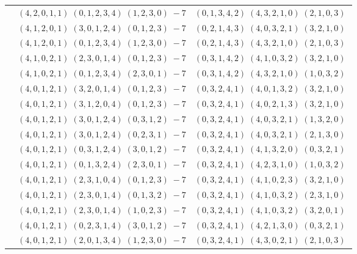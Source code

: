 \documentclass[11pt]{article}
\begin{document}
\begin{longtable}[l]{|c|c|c|}
 \cline{2-3} 
 & $(4 ,2 ,0 ,1 ,1) \;(0 ,1 ,2 ,3 ,4) \;(1 ,2 ,3 ,0) \;-7$ & $(0 ,1 ,3 ,4 ,2) \;(4 ,3 ,2 ,1 ,0) \;(2 ,1 ,0 ,3) \;$\\ 
 \cline{2-3} 
 & $(4 ,1 ,2 ,0 ,1) \;(3 ,0 ,1 ,2 ,4) \;(0 ,1 ,2 ,3) \;-7$ & $(0 ,2 ,1 ,4 ,3) \;(4 ,0 ,3 ,2 ,1) \;(3 ,2 ,1 ,0) \;$\\ 
 \cline{2-3} 
 & $(4 ,1 ,2 ,0 ,1) \;(0 ,1 ,2 ,3 ,4) \;(1 ,2 ,3 ,0) \;-7$ & $(0 ,2 ,1 ,4 ,3) \;(4 ,3 ,2 ,1 ,0) \;(2 ,1 ,0 ,3) \;$\\ 
 \cline{2-3} 
 & $(4 ,1 ,0 ,2 ,1) \;(2 ,3 ,0 ,1 ,4) \;(0 ,1 ,2 ,3) \;-7$ & $(0 ,3 ,1 ,4 ,2) \;(4 ,1 ,0 ,3 ,2) \;(3 ,2 ,1 ,0) \;$\\ 
 \cline{2-3} 
 & $(4 ,1 ,0 ,2 ,1) \;(0 ,1 ,2 ,3 ,4) \;(2 ,3 ,0 ,1) \;-7$ & $(0 ,3 ,1 ,4 ,2) \;(4 ,3 ,2 ,1 ,0) \;(1 ,0 ,3 ,2) \;$\\ 
 \cline{2-3} 
 & $(4 ,0 ,1 ,2 ,1) \;(3 ,2 ,0 ,1 ,4) \;(0 ,1 ,2 ,3) \;-7$ & $(0 ,3 ,2 ,4 ,1) \;(4 ,0 ,1 ,3 ,2) \;(3 ,2 ,1 ,0) \;$\\ 
 \cline{2-3} 
 & $(4 ,0 ,1 ,2 ,1) \;(3 ,1 ,2 ,0 ,4) \;(0 ,1 ,2 ,3) \;-7$ & $(0 ,3 ,2 ,4 ,1) \;(4 ,0 ,2 ,1 ,3) \;(3 ,2 ,1 ,0) \;$\\ 
 \cline{2-3} 
 & $(4 ,0 ,1 ,2 ,1) \;(3 ,0 ,1 ,2 ,4) \;(0 ,3 ,1 ,2) \;-7$ & $(0 ,3 ,2 ,4 ,1) \;(4 ,0 ,3 ,2 ,1) \;(1 ,3 ,2 ,0) \;$\\ 
 \cline{2-3} 
 & $(4 ,0 ,1 ,2 ,1) \;(3 ,0 ,1 ,2 ,4) \;(0 ,2 ,3 ,1) \;-7$ & $(0 ,3 ,2 ,4 ,1) \;(4 ,0 ,3 ,2 ,1) \;(2 ,1 ,3 ,0) \;$\\ 
 \cline{2-3} 
 & $(4 ,0 ,1 ,2 ,1) \;(0 ,3 ,1 ,2 ,4) \;(3 ,0 ,1 ,2) \;-7$ & $(0 ,3 ,2 ,4 ,1) \;(4 ,1 ,3 ,2 ,0) \;(0 ,3 ,2 ,1) \;$\\ 
 \cline{2-3} 
 & $(4 ,0 ,1 ,2 ,1) \;(0 ,1 ,3 ,2 ,4) \;(2 ,3 ,0 ,1) \;-7$ & $(0 ,3 ,2 ,4 ,1) \;(4 ,2 ,3 ,1 ,0) \;(1 ,0 ,3 ,2) \;$\\ 
 \cline{2-3} 
 & $(4 ,0 ,1 ,2 ,1) \;(2 ,3 ,1 ,0 ,4) \;(0 ,1 ,2 ,3) \;-7$ & $(0 ,3 ,2 ,4 ,1) \;(4 ,1 ,0 ,2 ,3) \;(3 ,2 ,1 ,0) \;$\\ 
 \cline{2-3} 
 & $(4 ,0 ,1 ,2 ,1) \;(2 ,3 ,0 ,1 ,4) \;(0 ,1 ,3 ,2) \;-7$ & $(0 ,3 ,2 ,4 ,1) \;(4 ,1 ,0 ,3 ,2) \;(2 ,3 ,1 ,0) \;$\\ 
 \cline{2-3} 
 & $(4 ,0 ,1 ,2 ,1) \;(2 ,3 ,0 ,1 ,4) \;(1 ,0 ,2 ,3) \;-7$ & $(0 ,3 ,2 ,4 ,1) \;(4 ,1 ,0 ,3 ,2) \;(3 ,2 ,0 ,1) \;$\\ 
 \cline{2-3} 
 & $(4 ,0 ,1 ,2 ,1) \;(0 ,2 ,3 ,1 ,4) \;(3 ,0 ,1 ,2) \;-7$ & $(0 ,3 ,2 ,4 ,1) \;(4 ,2 ,1 ,3 ,0) \;(0 ,3 ,2 ,1) \;$\\ 
 \cline{2-3} 
 & $(4 ,0 ,1 ,2 ,1) \;(2 ,0 ,1 ,3 ,4) \;(1 ,2 ,3 ,0) \;-7$ & $(0 ,3 ,2 ,4 ,1) \;(4 ,3 ,0 ,2 ,1) \;(2 ,1 ,0 ,3) \;$\\ 

\end{longtable}
\end{document}
